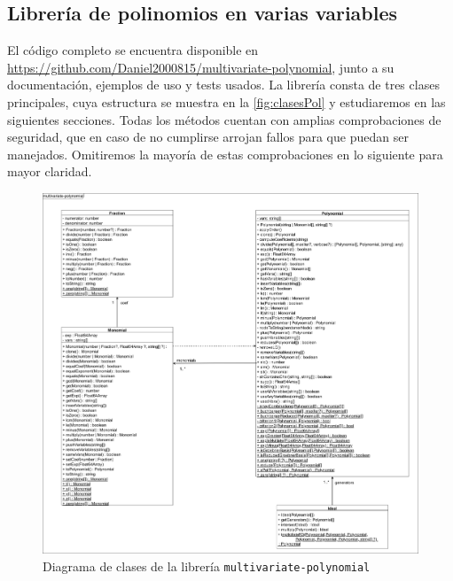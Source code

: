 \subsection{Librería de polinomios en varias variables}\label{sec:lib}
 El código completo se encuentra disponible en \href{https://github.com/Daniel2000815/multivariate-polynomial}{https://github.com/Daniel2000815/multivariate-polynomial}, junto a su documentación, ejemplos de uso y tests usados. La librería consta de tres clases principales, cuya estructura se muestra en la \autoref{fig:clasesPol} y estudiaremos en las siguientes secciones. Todas los métodos cuentan con amplias comprobaciones de seguridad, que en caso de no cumplirse arrojan fallos para que puedan ser manejados. Omitiremos la mayoría de estas comprobaciones en lo siguiente para mayor claridad.
\begin{figure}[ht!]
    \centering
    \includegraphics[width=\textwidth]{Plantilla-TFG-master/img/claseFinal.png}
    \caption{Diagrama de clases de la librería \texttt{multivariate-polynomial}}
    \label{fig:clasesPol}
\end{figure}

